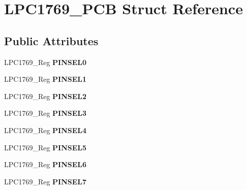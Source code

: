 \hypertarget{struct_l_p_c1769___p_c_b}{\section{L\+P\+C1769\+\_\+\+P\+C\+B Struct Reference}
\label{struct_l_p_c1769___p_c_b}
}
\subsection*{Public Attributes}
\begin{DoxyCompactItemize}
\item 
\hypertarget{struct_l_p_c1769___p_c_b_a68940dff298029649dd0c2db4b47ff5c}{L\+P\+C1769\+\_\+\+Reg {\bfseries P\+I\+N\+S\+E\+L0}}\label{struct_l_p_c1769___p_c_b_a68940dff298029649dd0c2db4b47ff5c}

\item 
\hypertarget{struct_l_p_c1769___p_c_b_a3be3f3c609c301f76817b6e8126e8d7f}{L\+P\+C1769\+\_\+\+Reg {\bfseries P\+I\+N\+S\+E\+L1}}\label{struct_l_p_c1769___p_c_b_a3be3f3c609c301f76817b6e8126e8d7f}

\item 
\hypertarget{struct_l_p_c1769___p_c_b_a367752e90ed07a83ce2577a47e6f7bde}{L\+P\+C1769\+\_\+\+Reg {\bfseries P\+I\+N\+S\+E\+L2}}\label{struct_l_p_c1769___p_c_b_a367752e90ed07a83ce2577a47e6f7bde}

\item 
\hypertarget{struct_l_p_c1769___p_c_b_a7253f85c2644005c53a2909ee230fee0}{L\+P\+C1769\+\_\+\+Reg {\bfseries P\+I\+N\+S\+E\+L3}}\label{struct_l_p_c1769___p_c_b_a7253f85c2644005c53a2909ee230fee0}

\item 
\hypertarget{struct_l_p_c1769___p_c_b_a1dd1e46a7dc604edf4f38486ca9de4f1}{L\+P\+C1769\+\_\+\+Reg {\bfseries P\+I\+N\+S\+E\+L4}}\label{struct_l_p_c1769___p_c_b_a1dd1e46a7dc604edf4f38486ca9de4f1}

\item 
\hypertarget{struct_l_p_c1769___p_c_b_a97e5e86550d635ddc572533d53b3da41}{L\+P\+C1769\+\_\+\+Reg {\bfseries P\+I\+N\+S\+E\+L5}}\label{struct_l_p_c1769___p_c_b_a97e5e86550d635ddc572533d53b3da41}

\item 
\hypertarget{struct_l_p_c1769___p_c_b_af469cad0eae6463ec4bf49f83d794773}{L\+P\+C1769\+\_\+\+Reg {\bfseries P\+I\+N\+S\+E\+L6}}\label{struct_l_p_c1769___p_c_b_af469cad0eae6463ec4bf49f83d794773}

\item 
\hypertarget{struct_l_p_c1769___p_c_b_adf6dcb03115929159432e54bb4aa0f38}{L\+P\+C1769\+\_\+\+Reg {\bfseries P\+I\+N\+S\+E\+L7}}\label{struct_l_p_c1769___p_c_b_adf6dcb03115929159432e54bb4aa0f38}


\end{DoxyCompactItemize}
